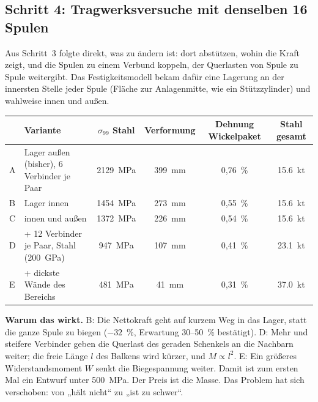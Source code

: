 \subsection*{Schritt 4: Tragwerksversuche mit denselben 16 Spulen}
Aus Schritt~3 folgte direkt, was zu ändern ist: dort abstützen, wohin die Kraft zeigt, und die Spulen zu einem
Verbund koppeln, der Querlasten von Spule zu Spule weitergibt. Das Festigkeitsmodell bekam dafür eine Lagerung an der
innersten Stelle jeder Spule (Fläche zur Anlagenmitte, wie ein Stützzylinder) und wahlweise innen und außen.


\begin{center}\small
\begin{tabular}{llcccc}
\toprule
 & Variante & $\sigma_{99}$ Stahl & Verformung & Dehnung Wickelpaket & Stahl gesamt \\
\midrule
A & Lager außen (bisher), 6 Verbinder je Paar & \SI{2129}{MPa} & \SI{399}{mm} & 0,76~\% & \SI{15,6}{kt} \\
B & Lager innen & \SI{1454}{MPa} & \SI{273}{mm} & 0,55~\% & \SI{15,6}{kt} \\
C & innen und außen & \SI{1372}{MPa} & \SI{226}{mm} & 0,54~\% & \SI{15,6}{kt} \\
D & + 12 Verbinder je Paar, Stahl (200~GPa) & \SI{947}{MPa} & \SI{107}{mm} & 0,41~\% & \SI{23,1}{kt} \\
E & + dickste Wände des Bereichs & \SI{481}{MPa} & \SI{41}{mm} & 0,31~\% & \SI{37,0}{kt} \\
\bottomrule
\end{tabular}
\end{center}
\textbf{Warum das wirkt.} B: Die Nettokraft geht auf kurzem Weg in das Lager, statt die ganze Spule zu biegen
($-32$~\%, Erwartung 30--50~\% bestätigt). D: Mehr und steifere Verbinder geben die Querlast des geraden Schenkels an
die Nachbarn weiter; die freie Länge $l$ des Balkens wird kürzer, und $M \propto l^2$. E: Ein größeres
Widerstandsmoment $W$ senkt die Biegespannung weiter. Damit ist zum ersten Mal ein Entwurf unter \SI{500}{MPa}. Der
Preis ist die Masse. Das Problem hat sich verschoben: von „hält nicht“ zu „ist zu schwer“.

